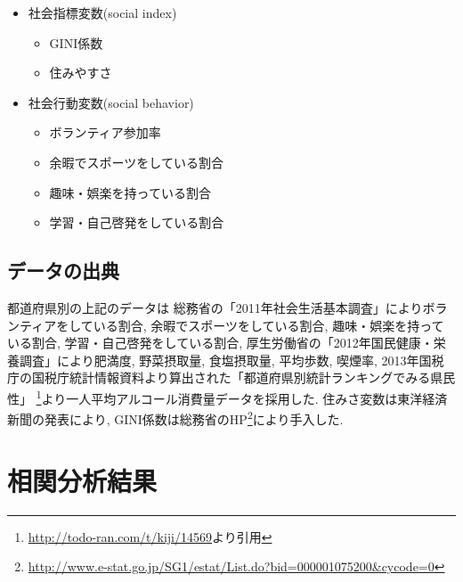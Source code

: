 \begin{itemize} \setlength{\itemsep}{-0.5mm} \setlength{\parskip}{-0.5mm}
	\item 社会指標変数(social index)
	      \begin{itemize} \setlength{\itemsep}{-0.5mm} \setlength{\parskip}{-0.5mm}
		      \item 	GINI係数
		      \item 	住みやすさ　%
	      \end{itemize}
	\item 社会行動変数(social behavior)
	      \begin{itemize} \setlength{\itemsep}{-0.5mm} \setlength{\parskip}{-0.5mm}
		      \item 	ボランティア参加率
		      \item 	余暇でスポーツをしている割合
		      \item 	趣味・娯楽を持っている割合
		      \item 	学習・自己啓発をしている割合
	      \end{itemize}
\end{itemize}

\subsection{データの出典}
都道府県別の上記のデータは
総務省の「2011年社会生活基本調査」によりボランティアをしている割合, 余暇でスポーツをしている割合, 趣味・娯楽を持っている割合, 学習・自己啓発をしている割合,
厚生労働省の「2012年国民健康・栄養調査」により肥満度, 野菜摂取量, 食塩摂取量, 平均歩数, 喫煙率,
2013年国税庁の国税庁統計情報資料より算出された「都道府県別統計ランキングでみる県民性」
\footnote{\url{http://todo-ran.com/t/kiji/14569}より引用}より一人平均アルコール消費量データを採用した.
住みさ変数は東洋経済新聞の発表により, GINI係数は総務省のHP\footnote{\url{http://www.e-stat.go.jp/SG1/estat/List.do?bid=000001075200&cycode=0}}により手入した.

%
%
%
%

\section{相関分析結果}

